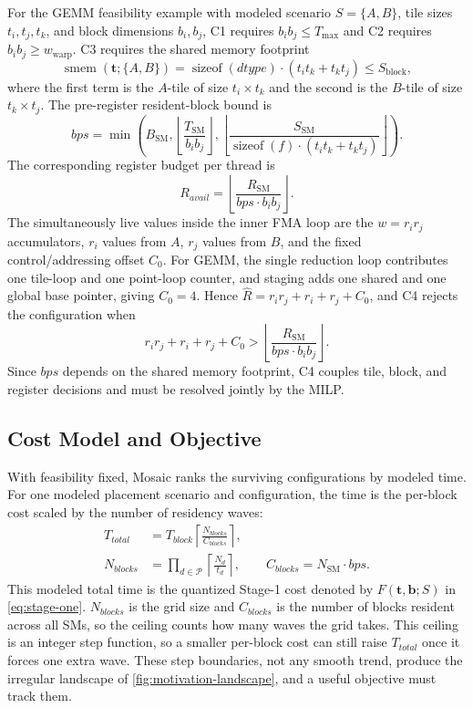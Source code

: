 \documentclass[acmsmall,review,anonymous,screen]{acmart}
\newcommand{\name}{{Mosaic}\xspace}
\newcommand{\tile}{t}
\newcommand{\tvec}{\mathbf{t}}
\newcommand{\rblk}{r}
\newcommand{\work}{w}
\newcommand{\Rsm}{R_{\mathrm{SM}}}
\newcommand{\Ssm}{S_{\mathrm{SM}}}
\newcommand{\Sblock}{S_{\mathrm{block}}}
\newcommand{\Bsm}{B_{\mathrm{SM}}}
\newcommand{\Tsm}{T_{\mathrm{SM}}}
\newcommand{\Nsm}{N_{\mathrm{SM}}}
\newcommand{\Tmax}{T_{\max}}
\newcommand{\Wwarp}{w_{\mathrm{warp}}}
\newcommand{\Czero}{C_0}
\begin{document}
For the GEMM feasibility example with modeled scenario \(S=\{A,B\}\), tile sizes
\(\tile_i,\tile_j,\tile_k\), and
block dimensions \(b_i,b_j\), C1 requires \(b_i b_j\le \Tmax\) and C2
requires \(b_i b_j\ge \Wwarp\). C3 requires the shared memory footprint
\[
\operatorname{smem}(\tvec;\{A,B\}) =
\operatorname{sizeof}(\mathit{dtype})\cdot(\tile_i\tile_k+\tile_k\tile_j)
\le \Sblock,
\]
where the first term is the \(A\)-tile of size \(\tile_i\times\tile_k\) and the
second is the \(B\)-tile of size \(\tile_k\times\tile_j\). The pre-register
resident-block bound is
\[
bps=\min\left(\Bsm,
\left\lfloor \frac{\Tsm}{b_i b_j}\right\rfloor,
\left\lfloor
\frac{\Ssm}{\operatorname{sizeof}(f)\cdot(\tile_i\tile_k+\tile_k\tile_j)}
\right\rfloor\right).
\]
The corresponding register budget per thread is
\[
R_{\mathit{avail}}=\left\lfloor
\frac{\Rsm}{bps\cdot b_i b_j}\right\rfloor.
\]
The simultaneously live values inside the inner FMA loop are the \(\work=\rblk_i\rblk_j\) accumulators, \(\rblk_i\) values from \(A\), \(\rblk_j\) values from \(B\), and the fixed control/addressing offset \(\Czero\). For GEMM, the single reduction loop contributes one tile-loop and one point-loop counter, and staging adds one shared and one global base pointer, giving \(\Czero=4\). Hence \(\hat{R}=\rblk_i\rblk_j+\rblk_i+\rblk_j+\Czero\), and C4 rejects the configuration when
\[
\rblk_i\rblk_j+\rblk_i+\rblk_j+\Czero >
\left\lfloor \frac{\Rsm}{bps\cdot b_i b_j}\right\rfloor.
\]
Since \(bps\) depends on the shared memory footprint, C4 couples tile, block, and register decisions and must be resolved jointly by the MILP.

\subsection{Cost Model and Objective}
\label{sec:cost}
\label{sec:outer-product-optimality}
\label{sec:kernel-specialization}

With feasibility fixed, \name ranks the surviving configurations by modeled time. For one modeled placement scenario and configuration, the time is the per-block cost scaled by the number of residency waves:
\begin{equation}
\begin{aligned}
T_{\mathit{total}}
&=T_{\mathit{block}}
  \left\lceil\frac{N_{\mathit{blocks}}}{C_{\mathit{blocks}}}\right\rceil,\\[0.6ex]
N_{\mathit{blocks}}
&=\prod_{d\in\mathcal{P}}\left\lceil\frac{N_d}{\tile_d}\right\rceil,
\qquad C_{\mathit{blocks}}=\Nsm\cdot bps.
\end{aligned}
\label{eq:discrete-wave}
\end{equation}
This modeled total time is the quantized Stage-1 cost denoted by \(F(\tvec,\mathbf{b};S)\) in \autoref{eq:stage-one}.
\(N_{\mathit{blocks}}\) is the grid size and \(C_{\mathit{blocks}}\) is the number of blocks resident across all SMs, so the ceiling counts how many waves the grid takes. This ceiling is an integer step function, so a smaller per-block cost can still raise \(T_{\mathit{total}}\) once it forces one extra wave. These step boundaries, not any smooth trend, produce the irregular landscape of \autoref{fig:motivation-landscape}, and a useful objective must track them.
\end{document}
